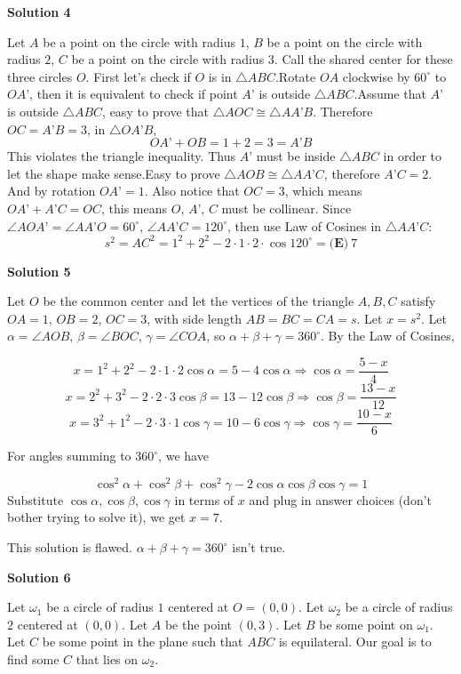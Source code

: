 \begin{enumerate}
 



\textbf{Solution 4}

Let $A$ be a point on the circle with radius $1$, $B$ be a point on the circle with radius $2$, $C$ be a point on the circle with radius $3$. Call the shared center for these three circles $O$. First let’s check if $O$ is in $\triangle ABC$.Rotate $OA$ clockwise by $60^{\circ}$ to $OA’$, then it is equivalent to check if point $A’$ is outside $\triangle ABC$.Assume that $A’$ is outside $\triangle ABC$, easy to prove that $\triangle AOC\cong \triangle AA’B$. Therefore $OC=A’B=3$, in $\triangle OA’B$,
 \[OA’+OB=1+2=3=A’B\]This violates the triangle inequality. Thus $A’$ must be inside $\triangle ABC$ in order to let the shape make sense.Easy to prove $\triangle AOB\cong \triangle AA’C$, therefore $A’C=2$. And by rotation $OA’=1$. Also notice that $OC=3$, which means $OA’+A’C=OC$, this means $O$, $A’$, $C$ must be collinear. Since $\angle AOA’=\angle AA’O=60^{\circ}$, $\angle AA’C=120^{\circ}$, then use Law of Cosines in $\triangle AA’C$:
 \[s^{2}=AC^{2}=1^{2}+2^{2}-2\cdot 1\cdot{2}\cdot\cos 120^{\circ}=\boxed{\textbf{(E)} \ 7}\]




\textbf{Solution 5}

Let $O$ be the common center and let the vertices of the triangle $A,B,C$ satisfy $OA=1$, $OB=2$, $OC=3$, with side length $AB=BC=CA=s$. Let $x=s^{2}$. Let $\alpha=\angle AOB$, $\beta=\angle BOC$, $\gamma=\angle COA$, so $\alpha+\beta+\gamma=360^\circ$. By the Law of Cosines,

 
 \[x = 1^2+2^2-2\cdot1\cdot2\cos\alpha = 5-4\cos\alpha \Rightarrow \cos\alpha = \frac{5-x}{4}\]
 \[x = 2^2+3^2-2\cdot2\cdot3\cos\beta = 13-12\cos\beta \Rightarrow \cos\beta = \frac{13-x}{12}\]
 \[x = 3^2+1^2-2\cdot3\cdot1\cos\gamma = 10-6\cos\gamma \Rightarrow \cos\gamma = \frac{10-x}{6}\]

 For angles summing to $360^\circ$, we have

 
 \[\cos^2\alpha+\cos^2\beta+\cos^2\gamma - 2\cos\alpha\cos\beta\cos\gamma = 1\]Substitute $\cos\alpha,\cos\beta,\cos\gamma$ in terms of $x$ and plug in answer choices (don't bother trying to solve it), we get $x = \boxed{7}$. 

 This solution is flawed. $\alpha+\beta+\gamma=360^\circ$ isn't true.

 



\textbf{Solution 6}

Let $\omega_1$ be a circle of radius $1$ centered at $O=(0, 0)$. Let $\omega_2$ be a circle of radius $2$ centered at $(0, 0)$. Let $A$ be the point $(0, 3)$. Let $B$ be some point on $\omega_1$. Let $C$ be some point in the plane such that $ABC$ is equilateral. Our goal is to find some $C$ that lies on $\omega_2$. 


\end{enumerate}
